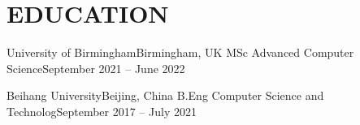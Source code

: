 \section{EDUCATION}


\begin{CVentries}
  \CVentry
    \CVhead
      {University of Birmingham}{Birmingham, UK}
      {MSc Advanced Computer Science}{September 2021 -- June 2022}

    \CVhead
      {Beihang University}{Beijing, China}
      {B.Eng Computer Science and Technolog}{September 2017 -- July 2021}
\end{CVentries}